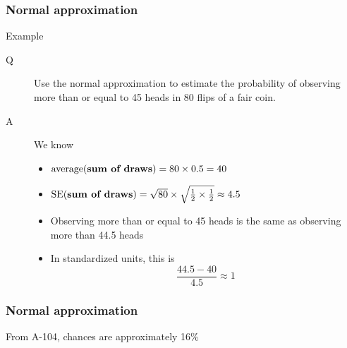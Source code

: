 \documentclass[handout]{beamer}
\begin{document}
   \begin{frame} \frametitle{Normal approximation}

   \begin{block}
   {Example}
   \begin{description}
   \item[Q] Use the normal approximation to estimate the
     probability of observing more than or equal to 45 heads in 80 flips of a fair coin.
   \item[A] We know
     \begin{itemize}
     \item $\text{average({\bf sum of draws})} = 80 \times 0.5 = 40 $
     \item $\text{SE({\bf sum of draws})} = \sqrt{80} \times \sqrt{\frac{1}{2}  \times \frac{1}{2}} \approx 4.5 $
     \item Observing more than or equal to 45 heads is the same as observing more than 44.5 heads
       \item In standardized units, this is
       $$
       \frac{44.5-40}{4.5} \approx 1
       $$
     \end{itemize}
   \end{description}
   \end{block}
   \end{frame}



   \begin{frame}
   \frametitle{Normal approximation}
   \begin{center}
   \end{center}
   From A-104, chances are approximately 16\%
   \end{frame}
\end{document}
